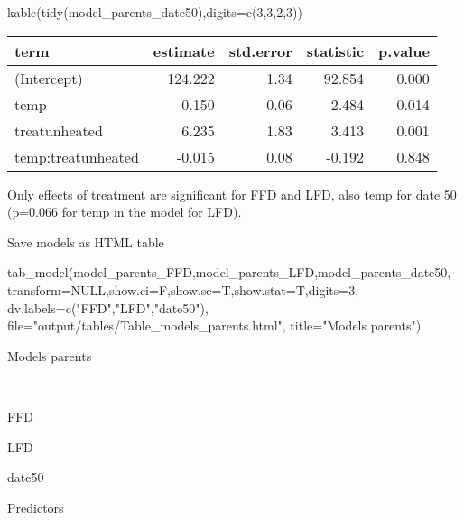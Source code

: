 \documentclass[
]{article}
\newenvironment{Shaded}{\begin{snugshade}}{\end{snugshade}}
\newcommand{\AttributeTok}[1]{\textcolor[rgb]{0.77,0.63,0.00}{#1}}
\newcommand{\ConstantTok}[1]{\textcolor[rgb]{0.00,0.00,0.00}{#1}}
\newcommand{\DecValTok}[1]{\textcolor[rgb]{0.00,0.00,0.81}{#1}}
\newcommand{\FunctionTok}[1]{\textcolor[rgb]{0.00,0.00,0.00}{#1}}
\newcommand{\NormalTok}[1]{#1}
\newcommand{\StringTok}[1]{\textcolor[rgb]{0.31,0.60,0.02}{#1}}
\begin{document}
\begin{Shaded}
\begin{Highlighting}[]
\FunctionTok{kable}\NormalTok{(}\FunctionTok{tidy}\NormalTok{(model\_parents\_date50),}\AttributeTok{digits=}\FunctionTok{c}\NormalTok{(}\DecValTok{3}\NormalTok{,}\DecValTok{3}\NormalTok{,}\DecValTok{2}\NormalTok{,}\DecValTok{3}\NormalTok{))}
\end{Highlighting}
\end{Shaded}

\begin{longtable}[]{@{}lrrrr@{}}
\toprule()
term & estimate & std.error & statistic & p.value \\
\midrule()
\endhead
(Intercept) & 124.222 & 1.34 & 92.854 & 0.000 \\
temp & 0.150 & 0.06 & 2.484 & 0.014 \\
treatunheated & 6.235 & 1.83 & 3.413 & 0.001 \\
temp:treatunheated & -0.015 & 0.08 & -0.192 & 0.848 \\
\bottomrule()
\end{longtable}

Only effects of treatment are significant for FFD and LFD, also temp for
date 50 (p=0.066 for temp in the model for LFD).

Save models as HTML table

\begin{Shaded}
\begin{Highlighting}[]
\FunctionTok{tab\_model}\NormalTok{(model\_parents\_FFD,model\_parents\_LFD,model\_parents\_date50,}
          \AttributeTok{transform=}\ConstantTok{NULL}\NormalTok{,}\AttributeTok{show.ci=}\NormalTok{F,}\AttributeTok{show.se=}\NormalTok{T,}\AttributeTok{show.stat=}\NormalTok{T,}\AttributeTok{digits=}\DecValTok{3}\NormalTok{,}
          \AttributeTok{dv.labels=}\FunctionTok{c}\NormalTok{(}\StringTok{"FFD"}\NormalTok{,}\StringTok{"LFD"}\NormalTok{,}\StringTok{"date50"}\NormalTok{),}
          \AttributeTok{file=}\StringTok{"output/tables/Table\_models\_parents.html"}\NormalTok{,}
          \AttributeTok{title=}\StringTok{"Models parents"}\NormalTok{)}
\end{Highlighting}
\end{Shaded}

Models parents

~

FFD

LFD

date50

Predictors
\end{document}
